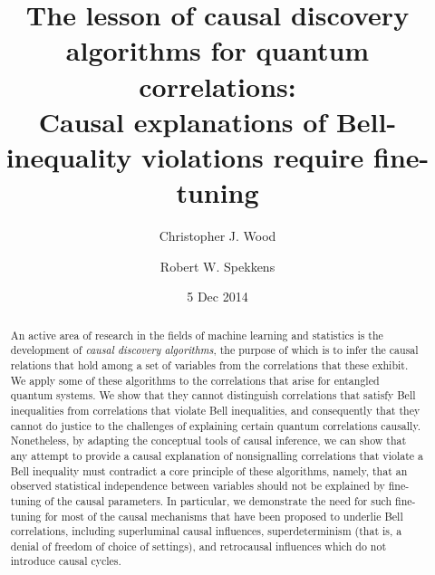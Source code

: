 \documentclass[12pt,onecolumn,nofootinbib]{revtex4-2}
\begin{document}
\title{The lesson of causal discovery algorithms for quantum correlations: \\ Causal explanations of Bell-inequality violations require fine-tuning}
\author{Christopher J. Wood}
\author{Robert W. Spekkens}
\date{5 Dec 2014}


\begin{abstract}
An active area of research in the fields of machine learning and statistics is the
development of \emph{causal discovery algorithms}, the purpose of which is
to infer the causal relations that hold among a set of variables from the
correlations that these exhibit. We apply some of these algorithms to the
correlations that arise for entangled quantum systems.  We show that they
cannot distinguish correlations that satisfy Bell inequalities from
correlations that violate Bell inequalities, and consequently that they cannot do
justice to the challenges of explaining certain quantum correlations
causally.  Nonetheless, by adapting the conceptual tools of causal inference, we can show that any attempt to provide a causal explanation of nonsignalling correlations that violate a Bell inequality must contradict a core
principle of these algorithms, namely, that an observed statistical
independence between variables should not be explained by fine-tuning of the
causal parameters.  In particular, we demonstrate the need for such fine-tuning for most of the causal mechanisms that have been proposed to underlie Bell correlations, including superluminal causal influences, superdeterminism (that is, a denial of freedom of choice of settings), and retrocausal influences which do not introduce causal cycles.
\end{abstract}

\maketitle

\newpage

\end{document}
